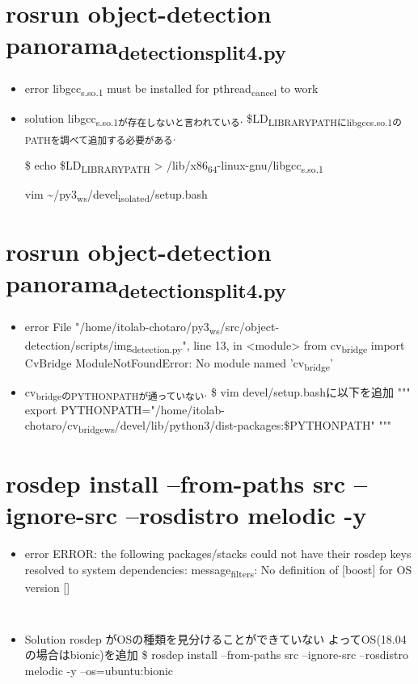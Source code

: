 \documentclass[11pt]{article}
\begin{document}
\section{rosrun object-detection panorama\textsubscript{detection}\textsubscript{split4.py}}
\label{sec:org141f5ba}
\begin{itemize}
\item error
libgcc\textsubscript{s.so.1} must be installed for pthread\textsubscript{cancel} to work

\item solution
libgcc\textsubscript{s.so.1が存在しないと言われている}.
\$LD\textsubscript{LIBRARY}\textsubscript{PATHにlibgcc}\textsubscript{s.so.1のPATHを調べて追加する必要がある}.

\$ echo \$LD\textsubscript{LIBRARY}\textsubscript{PATH}
> /lib/x86\textsubscript{64}-linux-gnu/libgcc\textsubscript{s.so.1}

vim \textasciitilde{}/py3\textsubscript{ws}/devel\textsubscript{isolated}/setup.bash
\end{itemize}

\section{rosrun object-detection panorama\textsubscript{detection}\textsubscript{split4.py}}
\label{sec:orge2515f2}
\begin{itemize}
\item error
File "/home/itolab-chotaro/py3\textsubscript{ws}/src/object-detection/scripts/img\textsubscript{detection.py}", line 13, in <module>
  from cv\textsubscript{bridge} import CvBridge
ModuleNotFoundError: No module named 'cv\textsubscript{bridge}'

\item cv\textsubscript{bridgeのPYTHONPATHが通っていない}.
\$ vim devel/setup.bashに以下を追加
"""
export PYTHONPATH="/home/itolab-chotaro/cv\textsubscript{bridge}\textsubscript{ws}/devel/lib/python3/dist-packages:\$PYTHONPATH"
"""
\end{itemize}




\section{rosdep install --from-paths src --ignore-src --rosdistro melodic -y}
\label{sec:org78318ce}
\begin{itemize}
\item error
ERROR: the following packages/stacks could not have their rosdep keys resolved
to system dependencies:
message\textsubscript{filters}: No definition of [boost] for OS version []
\begin{verbatim}


\end{verbatim}

\item Solution
rosdep がOSの種類を見分けることができていない
よってOS(18.04の場合はbionic)を追加
\$ rosdep install --from-paths src --ignore-src --rosdistro melodic -y  --os=ubuntu:bionic
\end{itemize}
\end{document}
